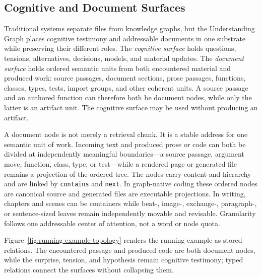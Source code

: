 \subsection{Cognitive and Document Surfaces}
\label{sec:graph-native-fs}

Traditional systems separate files from knowledge graphs, but the Understanding Graph places cognitive testimony and addressable documents in one substrate while preserving their different roles. The \emph{cognitive surface} holds questions, tensions, alternatives, decisions, models, and material updates. The \emph{document surface} holds ordered semantic units from both encountered material and produced work: source passages, document sections, prose passages, functions, classes, types, tests, import groups, and other coherent units. A source passage and an authored function can therefore both be document nodes, while only the latter is an artifact unit. The cognitive surface may be used without producing an artifact.

A document node is not merely a retrieval chunk. It is a stable address for one semantic unit of work. Incoming text and produced prose or code can both be divided at independently meaningful boundaries---a source passage, argument move, function, class, type, or test---while a rendered page or generated file remains a projection of the ordered tree. The nodes carry content and hierarchy and are linked by \texttt{contains} and \texttt{next}. In graph-native coding these ordered nodes are canonical source and generated files are executable projections. In writing, chapters and scenes can be containers while beat-, image-, exchange-, paragraph-, or sentence-sized leaves remain independently movable and revisable. Granularity follows one addressable center of attention, not a word or node quota.

Figure~\ref{fig:running-example-topology} renders the running example as stored relations. The encountered passage and produced code are both document nodes, while the surprise, tension, and hypothesis remain cognitive testimony; typed relations connect the surfaces without collapsing them.

